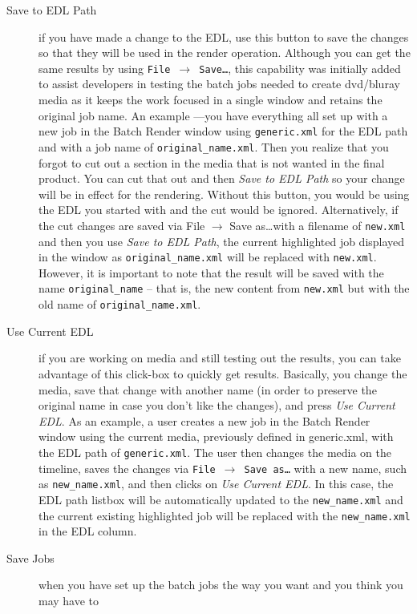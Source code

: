 \begin{description}
    \item[Save to EDL Path] if you have made a change to the EDL, use this button to save the changes so
    that they will be used in the render operation.  Although you can get the same results by using
    \texttt{File  $\rightarrow$  Save\dots}, this capability was initially added to assist developers in testing the batch jobs needed
    to create dvd/bluray media as it keeps the work focused in a single window and retains the original
    job name.  An example ---you have everything all set up with a new job in the Batch Render window 
    using \texttt{generic.xml} for the EDL path and with a job name of \texttt{original\_name.xml}.  Then you realize
    that you forgot to cut out a section in the media that is not wanted in the final product.  You can cut 
    that out and then \textit{Save to EDL Path} so your change will be in effect for the rendering.  Without this
    button, you would be using the EDL you started with and the cut would be ignored.  Alternatively, if 
    the cut changes are saved via File  $\rightarrow$  Save as\dots with a filename of \texttt{new.xml} and then you use \textit{Save to EDL Path}, the current highlighted job displayed in the window as \texttt{original\_name.xml} will be 
    replaced with \texttt{new.xml}.  However, it is important to note that the result will be saved with the name
    \texttt{original\_name} – that is, the new content from \texttt{new.xml} but with the old name of \texttt{original\_name.xml}.
    \item[Use Current EDL] if you are working on media and still testing out the results, you can take
    advantage of this click-box to quickly get results.  Basically, you change the media, save that change 
    with another name (in order to preserve the original name in case you don't like the changes), and
    press \textit{Use Current EDL}.  As an example, a user creates a new job in the Batch Render window
    using the current media, previously defined in generic.xml, with the EDL path of \texttt{generic.xml}.  The
    user then changes the media on the timeline, saves the changes via \texttt{File $\rightarrow$ Save as\dots} with a new 
    name, such as \texttt{new\_name.xml}, and then clicks on \textit{Use Current EDL}.  In this case, the EDL path
    listbox will be automatically updated to the \texttt{new\_name.xml} and the current existing highlighted job will be replaced with the \texttt{new\_name.xml} in the EDL column.
    \item[Save Jobs] when you have set up the batch jobs the way you want and you think you may have to

\end{description}
